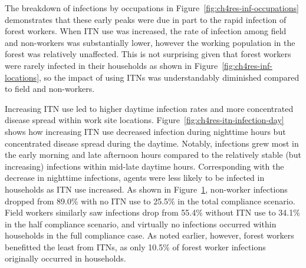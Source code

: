 \begin{figure}[htb!]
     \centering
    \label{fig:ch4res-itn-locations}
\end{figure}

The breakdown of infections by occupations in Figure~\ref{fig:ch4res-inf-occupations} demonstrates that these early peaks were due in part to the rapid infection of forest workers. When ITN use was increased, the rate of infection among field and non-workers was substantially lower, however the working population in the forest was relatively unaffected. This is not surprising given that forest workers were rarely infected in their households as shown in Figure~\ref{fig:ch4res-inf-locations}, so the impact of using ITNs was understandably diminished compared to field and non-workers.

Increasing ITN use led to higher daytime infection rates and more concentrated disease spread within work site locations. Figure~\ref{fig:ch4res-itn-infection-day} shows how increasing ITN use decreased infection during nighttime hours but concentrated disease spread during the daytime. Notably, infections grew most in the early morning and late afternoon hours compared to the relatively stable (but increasing) infections within mid-late daytime hours. Corresponding with the decrease in nighttime infections, agents were less likely to be infected in households as ITN use increased. As shown in Figure~\ref{fig:ch4res-itn-locations}, non-worker infections dropped from 89.0\% with no ITN use to 25.5\% in the total compliance scenario. Field workers similarly saw infections drop from 55.4\% without ITN use to 34.1\% in the half compliance scenario, and virtually no infections occurred within households in the full compliance case. As noted earlier, however, forest workers benefitted the least from ITNs, as only 10.5\% of forest worker infections originally occurred in households.


